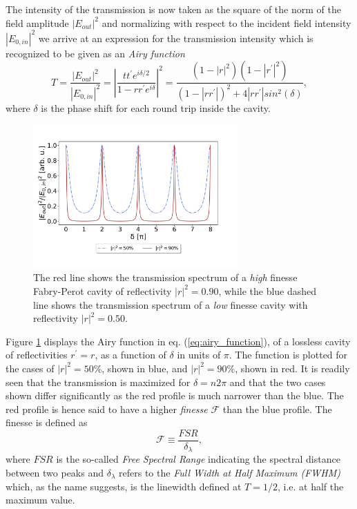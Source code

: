 The intensity of the transmission is now taken as the square of the norm of the field amplitude $|E_{out}|^2$ and normalizing with respect to the incident field intensity $|E_{0,in}|^2$ we arrive at an expression for the transmission intensity which is recognized to be given as an \emph{Airy function}\cite{Pedrotti}
\begin{equation}
    T = \frac{|E_{out}|^2}{|E_{0,in}|^2} = \left|\frac{tt^{\prime}e^{i\delta/2}}{1 - rr^{\prime}e^{i \delta}}\right|^2 = \frac{(1-|r|^2)(1-|r^{\prime}|^2)}{(1-|rr^{\prime}|)^2 + 4|rr^{\prime}|sin^2(\delta)},
    \label{eq:airy_function}
\end{equation}
where $\delta$ is the phase shift for each round trip inside the cavity.

\begin{figure}[h!]
    \centering
    \includegraphics[width=0.7\textwidth]{figures/fabry_perot_high_and_low_finesse.pdf}
    \caption{The red line shows the transmission spectrum of a \emph{high} finesse Fabry-Perot cavity of reflectivity $|r|^2 = 0.90$, while the blue dashed line shows the transmission spectrum of a \emph{low} finesse cavity with reflectivity $|r|^2 = 0.50$.}
    \label{fig:fabry_perot_trans}
\end{figure}

Figure \ref{fig:fabry_perot_trans} displays the Airy function in eq. (\ref{eq:airy_function}), of a lossless cavity of reflectivities $r^{\prime} = r$, as a function of $\delta$ in units of $\pi$. The function is plotted for the cases of $|r|^2 = 50 \%$, shown in blue, and $|r|^2 = 90 \%$, shown in red. It is readily seen that the transmission is maximized for $\delta = n 2 \pi$ and that the two cases shown differ significantly as the red profile is much narrower than the blue. The red profile is hence said to have a higher \emph{finesse} $\mathcal{F}$ than the blue profile. The finesse is defined as
\begin{equation}
    \mathcal{F} \equiv \frac{FSR}{\delta_{\lambda}},
    \label{eq:finesse_definition}
\end{equation}
where $FSR$ is the so-called \emph{Free Spectral Range} indicating the spectral distance between two peaks and $\delta_{\lambda}$ refers to the \emph{Full Width at Half Maximum (FWHM)} which, as the name suggests, is the linewidth defined at $T=1/2$, i.e. at half the maximum value. 

